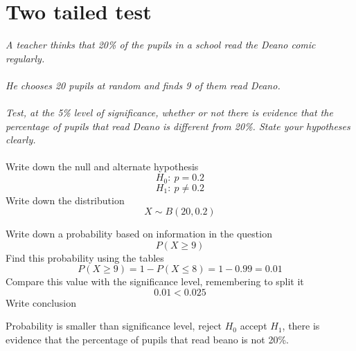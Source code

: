 \documentclass{article}[18pt]
\begin{document}
\section{Two tailed test}
\textit{A teacher thinks that 20\% of the pupils in a school read the Deano comic regularly.\\
\\
He chooses 20 pupils at random and finds 9 of them read Deano.}\\
\\
\textit{Test, at the 5\% level of significance, whether or not there is evidence that the
percentage of pupils that read Deano is different from 20\%. State your hypotheses
clearly.}\\
\\
Write down the null and alternate hypothesis
$$H_0: \ p=0.2$$
$$H_1: \ p\neq0.2$$
Write down the distribution
$$X\sim B(20,0.2)$$

Write down a probability based on information in the question
$$P(X\geqslant9)$$
Find this probability using the tables
$$P(X\geqslant9)=1-P(X\leqslant8)=1-0.99=0.01$$
Compare this value with the significance level, remembering to split it
$$0.01<0.025$$
Write conclusion
\begin{center}
Probability is smaller than significance level, reject $H_0$ accept $H_1$, there is evidence that the percentage of pupils that read beano is not 20\%. 
\end{center}
\end{document}
